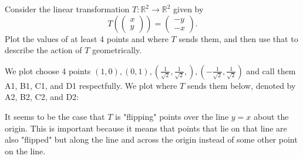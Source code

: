 \documentclass[12pt]{article}
\newenvironment{problem}[2][Problem]
{
	\begin{trivlist} 
		\item[\hskip \labelsep {\bfseries #1 #2:}]
	}
{
	\end{trivlist}
	}
\newenvironment{solution}[1][Solution]
{
	\begin{trivlist} 
		\item[\hskip \labelsep {\itshape #1:}]
	}
	{
	\end{trivlist}
}
\begin{document}
\newpage
\begin{problem}{2}
Consider the linear transformation $T:\mathbb{R} ^2 \to \mathbb{R} ^2$ given by
\[
T\left(\begin{pmatrix} x \\ y\end{pmatrix} \right)=\begin{pmatrix} -y \\ -x\end{pmatrix} \text{.}
\]
Plot the values of at least 4 points and where $T$ sends them, and then use that to describe the action of $T$ geometrically.
\begin{solution}
We plot choose 4 points $(1,0),(0,1),(\frac{1}{\sqrt{2}},\frac{1}{\sqrt{2}},),(-\frac{1}{\sqrt{2}},\frac{1}{\sqrt{2}})$ and call them A1, B1, C1, and D1 respectfully. We plot where $T$ sends them below, denoted by A2, B2, C2, and D2:
\newline
\newline
{}

It seems to be the case that $T$ is "flipping" points over the line $y=x$ about the origin. This is important because it means that points that lie on that line are also "flipped" but along the line and across the origin instead of some other point on the line.
\end{solution}
\end{problem}
\end{document}
